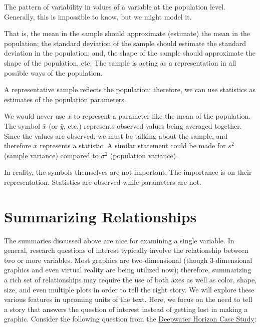 \documentclass[]{book}
\theoremstyle{plain}
\theoremstyle{mydefn}
\theoremstyle{myexmpl}
\theoremstyle{remark}
\let\BeginKnitrBlock\begin \let\EndKnitrBlock\end
\let\BeginKnitrBlock\begin \let\EndKnitrBlock\end
\begin{document}
\BeginKnitrBlock{definition}[Distribution of the Population]
\protect\hypertarget{def:defn-distribution-population}{}{\label{def:defn-distribution-population}
{} }The pattern of
variability in values of a variable at the population level. Generally,
this is impossible to know, but we might model it.
\EndKnitrBlock{definition}

That is, the mean in the sample should approximate (estimate) the mean
in the population; the standard deviation of the sample should estimate
the standard deviation in the population; and, the shape of the sample
should approximate the shape of the population, etc. The sample is
acting as a representation in all possible ways of the population.

\BeginKnitrBlock{rmdkeyidea}
A representative sample reflects the population; therefore, we can use
statistics as estimates of the population parameters.
\EndKnitrBlock{rmdkeyidea}

\BeginKnitrBlock{rmdtip}
We would never use \(\bar{x}\) to represent a parameter like the mean of
the population. The symbol \(\bar{x}\) (or \(\bar{y}\), etc.) represents
observed values being averaged together. Since the values are observed,
we must be talking about the sample, and therefore \(\bar{x}\)
represents a statistic. A similar statement could be made for \(s^2\)
(sample variance) compared to \(\sigma^2\) (population variance).

In reality, the symbols themselves are not important. The importance is
on their representation. Statistics are observed while parameters are
not.
\EndKnitrBlock{rmdtip}

\section{Summarizing Relationships}\label{summarizing-relationships}

The summaries discussed above are nice for examining a single variable.
In general, research questions of interest typically involve the
relationship between two or more variables. Most graphics are
two-dimensional (though 3-dimensional graphics and even virtual reality
are being utilized now); therefore, summarizing a rich set of
relationships may require the use of both axes as well as color, shape,
size, and even multiple plots in order to tell the right story. We will
explore these various features in upcoming units of the text. Here, we
focus on the need to tell a story that answers the question of interest
instead of getting lost in making a graphic. Consider the following
question from the \protect\hyperlink{CaseDeepwater}{Deepwater Horizon
Case Study}:
\end{document}
